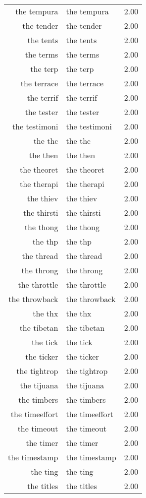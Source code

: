 \begin{table}[ht]
\begin{tabular}{rlr}
  the tempura & the tempura & 2.00 \\ 
  the tender & the tender & 2.00 \\ 
  the tents & the tents & 2.00 \\ 
  the terms & the terms & 2.00 \\ 
  the terp & the terp & 2.00 \\ 
  the terrace & the terrace & 2.00 \\ 
  the terrif & the terrif & 2.00 \\ 
  the tester & the tester & 2.00 \\ 
  the testimoni & the testimoni & 2.00 \\ 
  the thc & the thc & 2.00 \\ 
  the then & the then & 2.00 \\ 
  the theoret & the theoret & 2.00 \\ 
  the therapi & the therapi & 2.00 \\ 
  the thiev & the thiev & 2.00 \\ 
  the thirsti & the thirsti & 2.00 \\ 
  the thong & the thong & 2.00 \\ 
  the thp & the thp & 2.00 \\ 
  the thread & the thread & 2.00 \\ 
  the throng & the throng & 2.00 \\ 
  the throttle & the throttle & 2.00 \\ 
  the throwback & the throwback & 2.00 \\ 
  the thx & the thx & 2.00 \\ 
  the tibetan & the tibetan & 2.00 \\ 
  the tick & the tick & 2.00 \\ 
  the ticker & the ticker & 2.00 \\ 
  the tightrop & the tightrop & 2.00 \\ 
  the tijuana & the tijuana & 2.00 \\ 
  the timbers & the timbers & 2.00 \\ 
  the timeeffort & the timeeffort & 2.00 \\ 
  the timeout & the timeout & 2.00 \\ 
  the timer & the timer & 2.00 \\ 
  the timestamp & the timestamp & 2.00 \\ 
  the ting & the ting & 2.00 \\ 
  the titles & the titles & 2.00 \\ 

\end{tabular}
\end{table}
